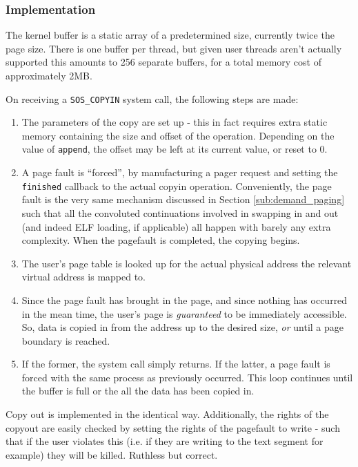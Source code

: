 \documentclass[12pt,english]{article}
\begin{document}
\subsubsection{Implementation}

The kernel buffer is a static array of a predetermined size, currently twice the page size.  There is one buffer per thread, but given user threads aren't actually supported this amounts to 256 separate buffers, for a total memory cost of approximately 2MB.

On receiving a \texttt{SOS\_COPYIN} system call, the following steps are made:
\begin{enumerate}
\item The parameters of the copy are set up - this in fact requires extra static memory containing the size and offset of the operation.  Depending on the value of \texttt{append}, the offset may be left at its current value, or reset to 0.
\item A page fault is ``forced'', by manufacturing a pager request and setting the \texttt{finished} callback to the actual copyin operation.  Conveniently, the page fault is the very same mechanism discussed in Section \ref{sub:demand_paging} such that all the convoluted continuations involved in swapping in and out (and indeed ELF loading, if applicable) all happen with barely any extra complexity.  When the pagefault is completed, the copying begins.
\item The user's page table is looked up for the actual physical address the relevant virtual address is mapped to.
\item Since the page fault has brought in the page, and since nothing has occurred in the mean time, the user's page is \emph{guaranteed} to be immediately accessible.  So, data is copied in from the address up to the desired size, \emph{or} until a page boundary is reached.
\item If the former, the system call simply returns.  If the latter, a page fault is forced with the same process as previously occurred.  This loop continues until the buffer is full or the all the data has been copied in.
\end{enumerate}

Copy out is implemented in the identical way.  Additionally, the rights of the copyout are easily checked by setting the rights of the pagefault to write - such that if the user violates this (i.e. if they are writing to the text segment for example) they will be killed.  Ruthless but correct.
\end{document}
